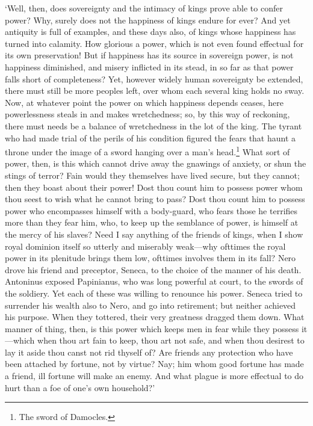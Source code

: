 \documentclass[12pt]{book}
\begin{document}
`Well, then, does sovereignty and the intimacy of kings prove able to
confer power? Why, surely does not the happiness of kings endure for
ever? And yet antiquity is full of examples, and these days also, of
kings whose happiness has turned into calamity. How glorious a power,
which is not even found effectual for its own preservation! But if
happiness has its source in sovereign power, is not happiness
diminished, and misery inflicted in its stead, in so far as that power
falls short of completeness? Yet, however widely human sovereignty be
extended, there must still be more peoples left, over whom each several
king holds no sway. Now, at whatever point the power on which happiness
depends ceases, here powerlessness steals in and makes wretchedness; so,
by this way of reckoning, there must needs be a balance of wretchedness
in the lot of the king. The tyrant who had made trial of the perils of
his condition figured the fears that haunt a throne under the image of a
sword hanging over a man's head.\footnote{The sword of Damocles.} What sort of power, then, is this
which cannot drive away the gnawings of anxiety, or shun the stings of
terror? Fain would they themselves have lived secure, but they cannot;
then they boast about their power! Dost thou count him to possess power
whom thou seest to wish what he cannot bring to pass? Dost thou count
him to possess power who encompasses himself with a body-guard, who
fears those he terrifies more than they fear him, who, to keep up the
semblance of power, is himself at the mercy of his slaves? Need I say
anything of the friends of kings, when I show royal dominion itself so
utterly and miserably weak---why ofttimes the royal power in its
plenitude brings them low, ofttimes involves them in its fall? Nero
drove his friend and preceptor, Seneca, to the choice of the manner of
his death. Antoninus exposed Papinianus, who was long powerful at
court, to the swords of the soldiery. Yet each of these was willing to
renounce his power. Seneca tried to surrender his wealth also to Nero,
and go into retirement; but neither achieved his purpose. When they
tottered, their very greatness dragged them down. What manner of thing,
then, is this power which keeps men in fear while they possess it---which
when thou art fain to keep, thou art not safe, and when thou desirest to
lay it aside thou canst not rid thyself of? Are friends any protection
who have been attached by fortune, not by virtue? Nay; him whom good
fortune has made a friend, ill fortune will make an enemy. And what
plague is more effectual to do hurt than a foe of one's own household?'
\end{document}
